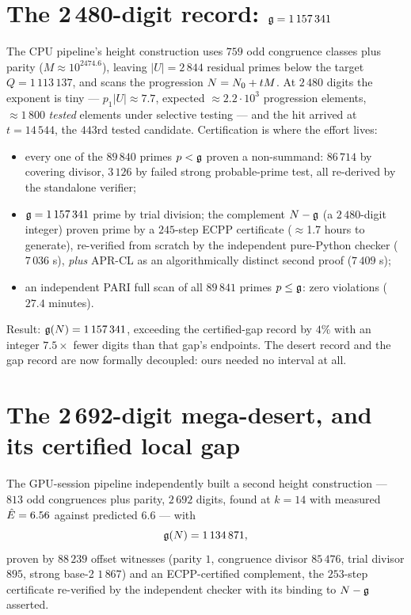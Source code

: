 \section{The 2\,480-digit record: $\mathfrak{g}=1\,157\,341$}\label{sec:g1}

The CPU pipeline's height construction uses $759$ odd congruence
classes plus parity ($M\approx10^{2474.6}$), leaving $|U|=2\,844$
residual primes below the target $Q=1\,113\,137$, and scans the
progression $N=N_0+tM$. At $2\,480$ digits the exponent is tiny ---
$p_1|U|\approx7.7$, expected $\approx$$2.2\cdot10^3$ progression
elements, $\approx1\,800$ \emph{tested} elements under selective
testing --- and the hit arrived at $t=14\,544$, the $443$rd tested
candidate. Certification is where the effort lives:

\begin{itemize}
\item every one of the $89\,840$ primes $p<\mathfrak{g}$ proven a non-summand:
$86\,714$ by covering divisor, $3\,126$ by failed strong
probable-prime test, all re-derived by the standalone verifier;
\item $\mathfrak{g}=1\,157\,341$ prime by trial division; the complement
$N-\mathfrak{g}$ (a $2\,480$-digit integer) proven prime by a $245$-step ECPP
certificate ($\approx$1.7 hours to generate), re-verified from scratch
by the independent pure-Python checker ($7\,036$ s), \emph{plus}
APR-CL as an algorithmically distinct second proof ($7\,409$ s);
\item an independent PARI full scan of all $89\,841$ primes
$p\le\mathfrak{g}$: zero violations ($27.4$ minutes).
\end{itemize}

Result: $\mathfrak{g}(N)=1\,157\,341$, exceeding the certified-gap record by
$4\%$ with an integer $7.5\times$ fewer digits than that gap's
endpoints. The desert record and the gap record are now formally
decoupled: ours needed no interval at all.

\section{The 2\,692-digit mega-desert, and its certified local gap}\label{sec:megagap}

The GPU-session pipeline independently built a second height
construction --- $813$ odd congruences plus parity, $2\,692$ digits,
found at $k=14$ with measured $\hat{E}=6.56$ against predicted $6.6$
--- with
\[
\mathfrak{g}(N)=1\,134\,871,
\]
proven by $88\,239$ offset witnesses (parity $1$, congruence divisor
$85\,476$, trial divisor $895$, strong base-2 $1\,867$) and an
ECPP-certified complement, the $253$-step certificate re-verified by
the independent checker with its binding to $N-\mathfrak{g}$ asserted.

